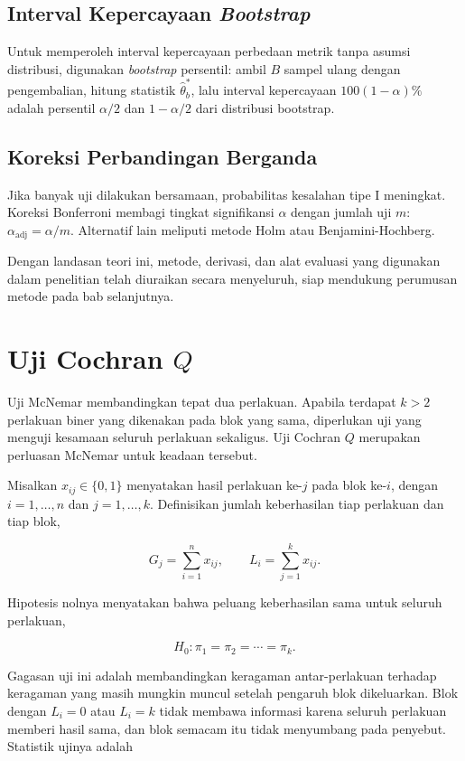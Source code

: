 \subsection{Interval Kepercayaan \textit{Bootstrap}}
Untuk memperoleh interval kepercayaan perbedaan metrik tanpa asumsi distribusi, digunakan \textit{bootstrap} persentil: ambil \(B\) sampel ulang dengan pengembalian, hitung statistik \(\hat{\theta}^*_b\), lalu interval kepercayaan \(100(1-\alpha)\%\) adalah persentil \(\alpha/2\) dan \(1-\alpha/2\) dari distribusi bootstrap.

\subsection{Koreksi Perbandingan Berganda}
Jika banyak uji dilakukan bersamaan, probabilitas kesalahan tipe I meningkat. Koreksi Bonferroni membagi tingkat signifikansi \(\alpha\) dengan jumlah uji \(m\): \(\alpha_{\mathrm{adj}} = \alpha / m\). Alternatif lain meliputi metode Holm atau Benjamini-Hochberg.

Dengan landasan teori ini, metode, derivasi, dan alat evaluasi yang digunakan dalam penelitian telah diuraikan secara menyeluruh, siap mendukung perumusan metode pada bab selanjutnya.
\section{Uji Cochran $Q$}
\label{sec:cochranq}

Uji McNemar membandingkan tepat dua perlakuan. Apabila terdapat $k>2$ perlakuan
biner yang dikenakan pada blok yang sama, diperlukan uji yang menguji kesamaan
seluruh perlakuan sekaligus. Uji Cochran $Q$ merupakan perluasan McNemar untuk
keadaan tersebut.

Misalkan $x_{ij}\in\{0,1\}$ menyatakan hasil perlakuan ke-$j$ pada blok ke-$i$,
dengan $i=1,\dots,n$ dan $j=1,\dots,k$. Definisikan jumlah keberhasilan tiap
perlakuan dan tiap blok,

\begin{equation}
    G_j = \sum_{i=1}^{n} x_{ij},
    \qquad
    L_i = \sum_{j=1}^{k} x_{ij}.
\end{equation}

Hipotesis nolnya menyatakan bahwa peluang keberhasilan sama untuk seluruh
perlakuan,

\begin{equation}
    H_0 : \pi_1 = \pi_2 = \cdots = \pi_k .
\end{equation}

Gagasan uji ini adalah membandingkan keragaman antar-perlakuan terhadap
keragaman yang masih mungkin muncul setelah pengaruh blok dikeluarkan. Blok
dengan $L_i = 0$ atau $L_i = k$ tidak membawa informasi karena seluruh
perlakuan memberi hasil sama, dan blok semacam itu tidak menyumbang pada
penyebut. Statistik ujinya adalah

